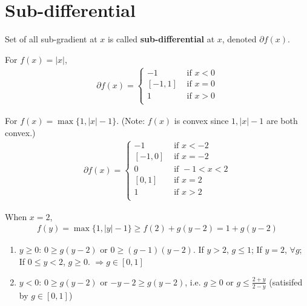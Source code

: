 \documentclass[11pt]{elegantbook}
\begin{document}
\section{Sub-differential}
\begin{definition}
    Set of all sub-gradient at $x$ is called \textbf{sub-differential} at $x$, denoted $\partial f(x)$.
\end{definition}
\begin{example}
For $f(x)=|x|$,
\begin{equation}
    \begin{aligned}
        \partial f(x)=\left\{\begin{matrix}
            -1&\text{ if }x<0\\
            [-1,1]&\text{ if }x=0\\
            1&\text{ if }x>0\\
        \end{matrix}\right.
    \end{aligned}
    \nonumber
\end{equation}
\end{example}

\begin{example}
For $f(x)=\max\{1,|x|-1\}$. (Note: $f(x)$ is convex since $1,|x|-1$ are both convex.)
\begin{equation}
    \begin{aligned}
        \partial f(x)=\left\{\begin{matrix}
            -1&\text{ if }x<-2\\
            [-1,0]&\text{ if }x=-2\\
            0&\text{ if }-1<x<2\\
            [0,1]&\text{ if }x=2\\
            1&\text{ if }x>2\\
        \end{matrix}\right.
    \end{aligned}
    \nonumber
\end{equation}
\end{example}
When $x=2$,
\begin{equation}
    \begin{aligned}
        f(y)=\max\{1,|y|-1\}\geq f(2)+g(y-2)=1+g(y-2)
    \end{aligned}
    \nonumber
\end{equation}
\begin{enumerate}[(1)]
    \item \underline{$y\geq 0$}: $0\geq g(y-2)$ or $0\geq (g-1)(y-2)$. If $y>2$, $g\leq 1$; If $y=2$, $\forall g$; If $0\leq y< 2$, $g\geq 0$. $\Rightarrow g\in[0,1]$
    \item \underline{$y< 0$}: $0\geq g(y-2)$ or $-y-2\geq g(y-2)$, i.e. $g\geq 0$ or $g\leq \frac{2+y}{2-y}$ (satisifed by $g\in[0,1]$)
\end{enumerate}
\end{document}
